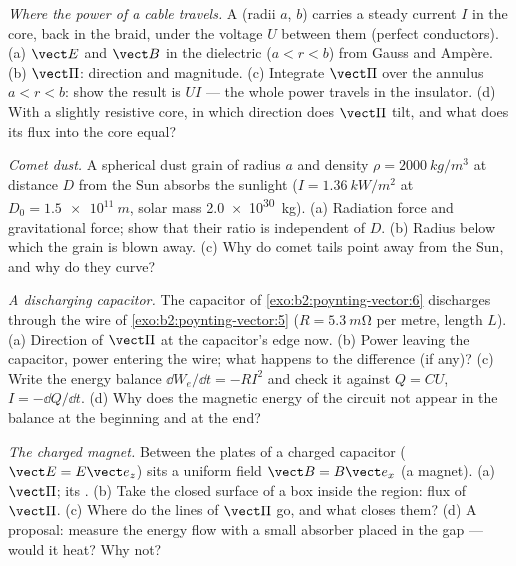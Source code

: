 \begin{exercise}[$\star\star$]\label{exo:b2:poynting-vector:8}
\emph{Where the power of a cable travels.} A  (radii $a$,
$b$) carries a steady current $I$ in the core, back in the braid, under
the voltage $U$ between them (perfect conductors). (a) $\vect E$ and $\vect B$
in the dielectric ($a < r < b$) from Gauss and Ampère. (b) $\vect\Pi$:
direction and magnitude. (c) Integrate $\vect\Pi$ over the annulus $a < r
< b$: show the result is $UI$ --- the whole power travels in the
insulator. (d) With a slightly resistive core, in which direction does
$\vect\Pi$ tilt, and what does its flux into the core equal?
\end{exercise}

\begin{exercise}[$\star\star$]\label{exo:b2:poynting-vector:9}
\emph{Comet dust.} A spherical dust grain of radius $a$ and density
$\rho = \qty{2000}{kg/m^3}$ at distance $D$ from the Sun absorbs the
sunlight ($I = \qty{1.36}{kW/m^2}$ at $D_0 = \qty{1.5e11}{m}$, solar mass
\qty{2.0e30}{kg}). (a) Radiation force and gravitational force; show that
their ratio is independent of $D$. (b) Radius below which the grain is
blown away. (c) Why do comet tails point away from the Sun, and why do
they curve?
\end{exercise}

\begin{exercise}[$\star\star\star$]\label{exo:b2:poynting-vector:10}
\emph{A discharging capacitor.} The capacitor of
\cref{exo:b2:poynting-vector:6} discharges through the wire of
\cref{exo:b2:poynting-vector:5} ($R = \qty{5.3}{m\ohm}$ per metre, length
$L$). (a) Direction of $\vect\Pi$ at the capacitor's edge now. (b) Power
leaving the capacitor, power entering the wire; what happens to the
difference (if any)? (c) Write the energy balance $\dd W_e/\dd t = -RI^2$
and check it against $Q = CU$, $I = -\dd Q/\dd t$. (d) Why does the
magnetic energy of the circuit not appear in the balance at the
beginning and at the end?
\end{exercise}

\begin{exercise}[$\star\star\star$]\label{exo:b2:poynting-vector:11}
\emph{The charged magnet.} Between the plates of a charged capacitor
($\vect E = E\vect e_z$) sits a uniform field $\vect B = B\vect e_x$ (a magnet).
(a) $\vect\Pi$; its . (b) Take the closed surface of a box
inside the region: flux of $\vect\Pi$. (c) Where do the lines of $\vect\Pi$
go, and what closes them? (d) A proposal: measure the energy flow with
a small absorber placed in the gap --- would it heat? Why not?
\end{exercise}


